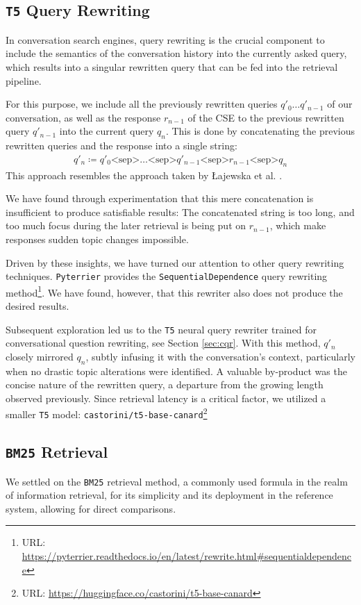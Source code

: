 \documentclass[sigconf]{acmart}
\begin{document}
\subsection{\texttt{T5} Query Rewriting}
In conversation search engines, query rewriting is the crucial component to include the semantics of the conversation history into the currently asked query, which results into a singular rewritten query that can be fed into the retrieval pipeline.

For this purpose, we include all the previously rewritten queries $q'_0 \dots q'_{n-1}$ of our conversation, as well as the response $r_{n-1}$ of the CSE to the previous rewritten query $q'_{n-1}$ into the current query $q_n$. This is done by concatenating the previous rewritten queries and the response into a single string:
\begin{align*}
	q'_n \coloneqq q'_0 \text{<sep>} \dots \text{<sep>} q'_{n-1} \text{<sep>} r_{n-1} \text{<sep>} q_n
\end{align*}
This approach resembles the approach taken by Łajewska et al. \cite{Lajewska:2023:ECIR}.

We have found through experimentation that this mere concatenation is insufficient to produce satisfiable results: The concatenated string is too long, and too much focus during the later retrieval is being put on $r_{n-1}$, which make responses sudden topic changes impossible.

Driven by these insights, we have turned our attention to other query rewriting techniques. \texttt{Pyterrier} provides the \texttt{Sequential\-Dependence} query rewriting method\footnote{URL: \url{https://pyterrier.readthedocs.io/en/latest/rewrite.html\#sequentialdependence}}. We have found, however, that this rewriter also does not produce the desired results.

Subsequent exploration led us to the \texttt{T5} neural query rewriter trained for conversational question rewriting, see Section \ref{sec:cqr}. With this method, $q'_n$ closely mirrored $q_n$, subtly infusing it with the conversation's context, particularly when no drastic topic alterations were identified. A valuable by-product was the concise nature of the rewritten query, a departure from the growing length observed previously. Since retrieval latency is a critical factor, we utilized a smaller \texttt{T5} model: \texttt{castorini\-/t5\--base\--canard}\footnote{URL: \url{https://huggingface.co/castorini/t5-base-canard}}

\subsection{\texttt{BM25} Retrieval}
We settled on the \texttt{BM25} retrieval method, a commonly used formula in the realm of information retrieval, for its simplicity and its deployment in the reference system, allowing for direct comparisons.
\end{document}
